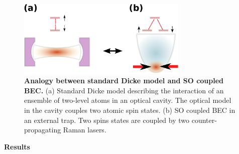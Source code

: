 \documentclass[prl,aps,twocolumn,floatfix]{revtex4}
\begin{document}
\begin{figure}[tbp]
\centering
\includegraphics[width=3.2in]{Figure-1Engels.eps}
\caption{\textbf{Analogy between standard Dicke model and SO coupled BEC.}
(a) Standard Dicke model describing the interaction of an ensemble
of two-level atoms in an optical cavity. The optical model in the cavity
couples two atomic spin states. (b) SO coupled BEC in an
external trap. Two spins states are coupled by two counter-propagating Raman
lasers. }
\label{Fig1}
\end{figure}

{\LARGE \textbf{Results}}
\end{document}
